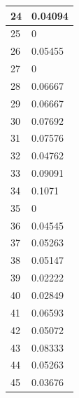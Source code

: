 \begin{tabular}{|l||l|}
	24 & 0.04094 \\ \hline
	25 & 0 \\ \hline
	26 & 0.05455 \\ \hline
	27 & 0 \\ \hline
	28 & 0.06667 \\ \hline
	29 & 0.06667 \\ \hline
	30 & 0.07692 \\ \hline
	31 & 0.07576 \\ \hline
	32 & 0.04762 \\ \hline
	33 & 0.09091 \\ \hline
	34 & 0.1071 \\ \hline
	35 & 0 \\ \hline
	36 & 0.04545 \\ \hline
	37 & 0.05263 \\ \hline
	38 & 0.05147 \\ \hline
	39 & 0.02222 \\ \hline
	40 & 0.02849 \\ \hline
	41 & 0.06593 \\ \hline
	42 & 0.05072 \\ \hline
	43 & 0.08333 \\ \hline
	44 & 0.05263 \\ \hline
	45 & 0.03676 \\ \hline
\end{tabular}
